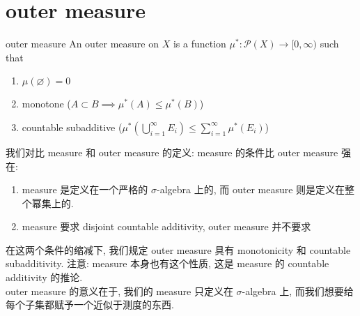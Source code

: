 \documentclass[lang=cn,11pt]{elegantbook}
\begin{document}
\section{outer measure}
\begin{definition}{outer measure}
    An outer measure on $X$ is a function $\mu^*: \mathcal{P}(X) \rightarrow {[0,\infty)}$ such that
    \begin{enumerate}
        \item $\mu(\varnothing) = 0$
        \item monotone ($A \subset  B \implies \mu^*(A) \leq \mu^*(B)$)
        \item countable subadditive ($\mu^*(\bigcup_{i=1}^\infty E_i)  \leq \sum_{i=1}^\infty \mu^*(E_i)$)
    \end{enumerate}
\end{definition}
\begin{remark}
    我们对比 measure 和 outer measure 的定义:
    measure 的条件比 outer measure 强在:
    \begin{enumerate}
        \item measure 是定义在一个严格的 $\sigma$-algebra 上的, 而 outer measure 则是定义在整个幂集上的. 
        \item measure 要求 disjoint countable additivity, outer measure 并不要求
    \end{enumerate}
\end{remark}

在这两个条件的缩减下, 我们规定 outer measure 具有 monotonicity 和 countable subadditivity. 注意: measure 本身也有这个性质, 这是 measure 的 countable additivity 的推论. \\
outer measure 的意义在于, 我们的 measure 只定义在 $\sigma$-algebra 上, 而我们想要给每个子集都赋予一个近似于测度的东西. 
\end{document}
